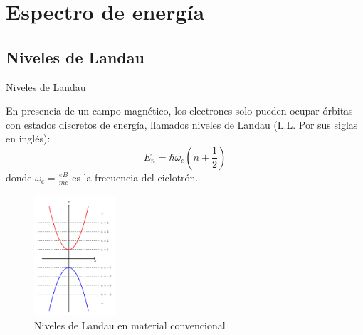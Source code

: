 \section{Espectro de energía}
\justifying

\subsection{Niveles de Landau}
\begin{frame}{Niveles de Landau}
	\begin{multicols}{2}
	En presencia de un campo magn\'etico, los electrones solo pueden ocupar \'orbitas con estados discretos de energ\'ia,
	llamados niveles de Landau (L.L. Por sus siglas en ingl\'es):
	\begin{equation}
		E_n = \hbar \omega_c (n+\frac{1}{2})
		\label{eq:landau}
	\end{equation}
	donde  $\omega_c=\frac{eB}{mc}$ es la frecuencia del ciclotrón.

	\begin{figure}[b!]
		\includegraphics[width=3cm,height=4.5cm]{graficas/LL_material.png}
			\caption{\scriptsize{Niveles de Landau en material convencional}}
	\end{figure}
	\end{multicols}
\end{frame}

